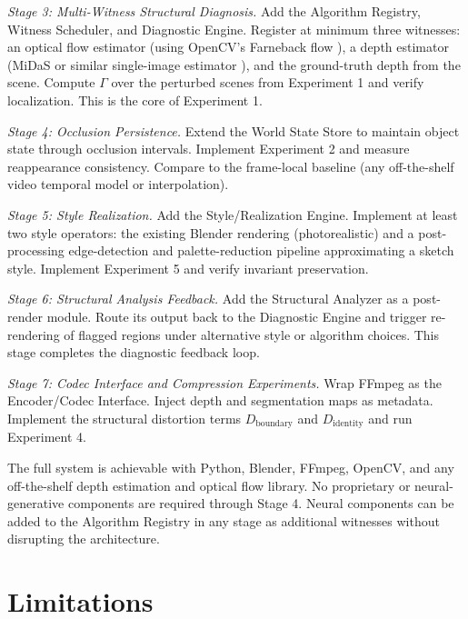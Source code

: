 \documentclass[12pt,a4paper]{article}
\theoremstyle{plain}
\theoremstyle{definition}
\theoremstyle{remark}
\begin{document}
\textit{Stage 3: Multi-Witness Structural Diagnosis.} Add the Algorithm Registry, Witness Scheduler, and Diagnostic Engine. Register at minimum three witnesses: an optical flow estimator (using OpenCV's Farneback flow \cite{farneback2003}), a depth estimator (MiDaS or similar single-image estimator \cite{ranftl2020}), and the ground-truth depth from the scene. Compute $\Gamma$ over the perturbed scenes from Experiment 1 and verify localization. This is the core of Experiment 1.

\textit{Stage 4: Occlusion Persistence.} Extend the World State Store to maintain object state through occlusion intervals. Implement Experiment 2 and measure reappearance consistency. Compare to the frame-local baseline (any off-the-shelf video temporal model or interpolation).

\textit{Stage 5: Style Realization.} Add the Style/Realization Engine. Implement at least two style operators: the existing Blender rendering (photorealistic) and a post-processing edge-detection and palette-reduction pipeline approximating a sketch style. Implement Experiment 5 and verify invariant preservation.

\textit{Stage 6: Structural Analysis Feedback.} Add the Structural Analyzer as a post-render module. Route its output back to the Diagnostic Engine and trigger re-rendering of flagged regions under alternative style or algorithm choices. This stage completes the diagnostic feedback loop.

\textit{Stage 7: Codec Interface and Compression Experiments.} Wrap FFmpeg \cite{ffmpeg2024} as the Encoder/Codec Interface. Inject depth and segmentation maps as metadata. Implement the structural distortion terms $D_{\mathrm{boundary}}$ and $D_{\mathrm{identity}}$ and run Experiment 4.

The full system is achievable with Python, Blender, FFmpeg, OpenCV, and any off-the-shelf depth estimation and optical flow library. No proprietary or neural-generative components are required through Stage 4. Neural components can be added to the Algorithm Registry in any stage as additional witnesses without disrupting the architecture.

\section{Limitations}
\label{sec:limitations}
\end{document}
